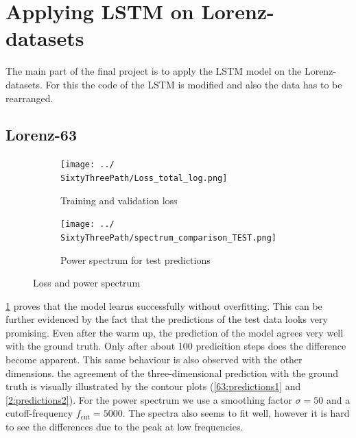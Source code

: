 \section{Applying LSTM on Lorenz-datasets} \label{sec3}

	The main part of the final project is to apply the LSTM model on the Lorenz-datasets. For this the code of the LSTM is modified and also the data has to be rearranged. 
	
\newpage	
\subsection{Lorenz-63}
	\newcommand{\SixtyThreePath}{Results/Lorenz-63/Figures/RNN-lstm-RDIM_3-N_used_50000-NUM-LAY_1-SIZE-LAY_100-ACT_tanh-ISH_statefull-SL_8-PL_4-LR_0.0001-DKP_1.0-ZKP_1.0-HSPL_300-IPL_200-NL_1-WID_0}
	\newcommand{\SixtyThreePathIndexOne}{33278}
	\newcommand{\SixtyThreePathIndexTwo}{45336}
	
	
	\begin{figure}[h]
		\centering
		\begin{subfigure}[b]{0.45\textwidth}
			\texttt{[image: ../\\SixtyThreePath/Loss\_total\_log.png]}
			\caption{Training and validation loss}
			\label{63:loss}
		\end{subfigure}
		\begin{subfigure}[b]{0.45\textwidth}
			\texttt{[image: ../\\SixtyThreePath/spectrum\_comparison\_TEST.png]}
			\caption{Power spectrum for test predictions}
			\label{63:spectrum}
		\end{subfigure}
		\caption{Loss and power spectrum}
	\end{figure}

	\cref{63:loss} proves that the model learns successfully without overfitting. This can be further evidenced by the fact that the predictions of the test data looks very promising. Even after the warm up, the prediction of the model agrees very well with the ground truth. Only after about 100 predicition steps does the difference become apparent. This same behaviour is also observed with the other dimensions. the agreement of the three-dimensional prediction with the ground truth is visually illustrated by the contour plots (\cref{63:predictions1} and \cref{2:predictions2}). 
	For the power spectrum we use a smoothing factor $\sigma=50$ and a cutoff-frequency $f_{\text{cut}}=5000$. The spectra also seems to fit well, however it is hard to see the differences due to the peak at low frequencies.
	
